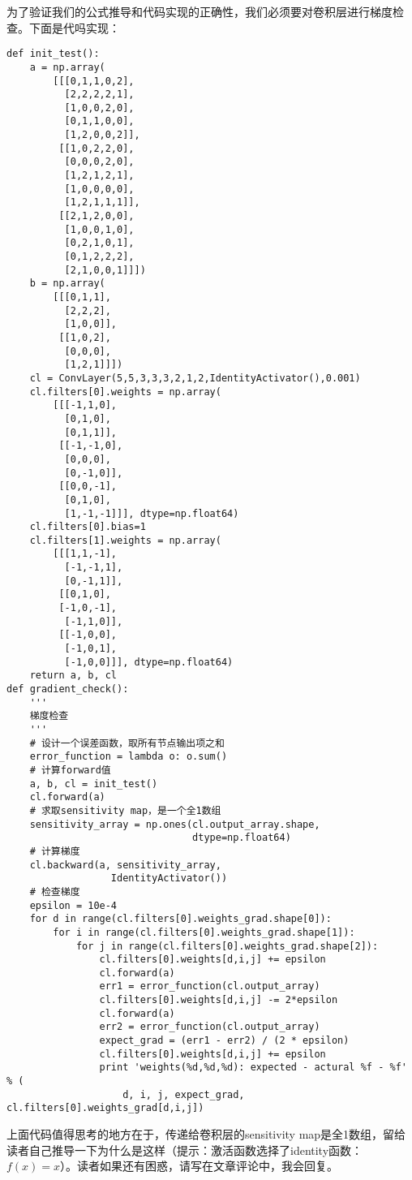 为了验证我们的公式推导和代码实现的正确性，我们必须要对卷积层进行梯度检查。下面是代吗实现：
\begin{lstlisting}
def init_test():
    a = np.array(
        [[[0,1,1,0,2],
          [2,2,2,2,1],
          [1,0,0,2,0],
          [0,1,1,0,0],
          [1,2,0,0,2]],
         [[1,0,2,2,0],
          [0,0,0,2,0],
          [1,2,1,2,1],
          [1,0,0,0,0],
          [1,2,1,1,1]],
         [[2,1,2,0,0],
          [1,0,0,1,0],
          [0,2,1,0,1],
          [0,1,2,2,2],
          [2,1,0,0,1]]])
    b = np.array(
        [[[0,1,1],
          [2,2,2],
          [1,0,0]],
         [[1,0,2],
          [0,0,0],
          [1,2,1]]])
    cl = ConvLayer(5,5,3,3,3,2,1,2,IdentityActivator(),0.001)
    cl.filters[0].weights = np.array(
        [[[-1,1,0],
          [0,1,0],
          [0,1,1]],
         [[-1,-1,0],
          [0,0,0],
          [0,-1,0]],
         [[0,0,-1],
          [0,1,0],
          [1,-1,-1]]], dtype=np.float64)
    cl.filters[0].bias=1
    cl.filters[1].weights = np.array(
        [[[1,1,-1],
          [-1,-1,1],
          [0,-1,1]],
         [[0,1,0],
         [-1,0,-1],
          [-1,1,0]],
         [[-1,0,0],
          [-1,0,1],
          [-1,0,0]]], dtype=np.float64)
    return a, b, cl
def gradient_check():
    '''
    梯度检查
    '''
    # 设计一个误差函数，取所有节点输出项之和
    error_function = lambda o: o.sum()
    # 计算forward值
    a, b, cl = init_test()
    cl.forward(a)
    # 求取sensitivity map，是一个全1数组
    sensitivity_array = np.ones(cl.output_array.shape,
                                dtype=np.float64)
    # 计算梯度
    cl.backward(a, sensitivity_array,
                  IdentityActivator())
    # 检查梯度
    epsilon = 10e-4
    for d in range(cl.filters[0].weights_grad.shape[0]):
        for i in range(cl.filters[0].weights_grad.shape[1]):
            for j in range(cl.filters[0].weights_grad.shape[2]):
                cl.filters[0].weights[d,i,j] += epsilon
                cl.forward(a)
                err1 = error_function(cl.output_array)
                cl.filters[0].weights[d,i,j] -= 2*epsilon
                cl.forward(a)
                err2 = error_function(cl.output_array)
                expect_grad = (err1 - err2) / (2 * epsilon)
                cl.filters[0].weights[d,i,j] += epsilon
                print 'weights(%d,%d,%d): expected - actural %f - %f' % (
                    d, i, j, expect_grad, cl.filters[0].weights_grad[d,i,j])   
\end{lstlisting}

上面代码值得思考的地方在于，传递给卷积层的sensitivity
map是全1数组，留给读者自己推导一下为什么是这样（提示：激活函数选择了identity函数：{}\(f(x)=x\)）。读者如果还有困惑，请写在文章评论中，我会回复。

